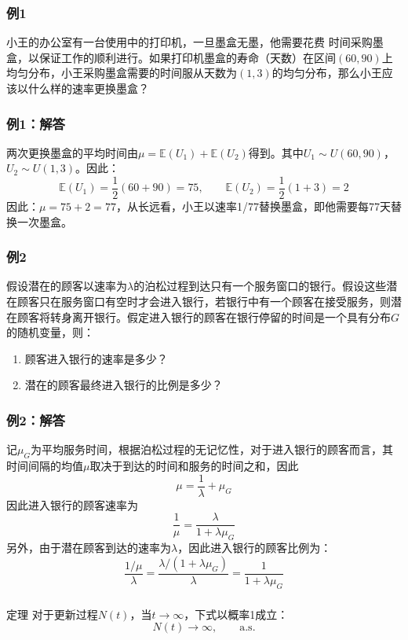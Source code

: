 \documentclass[t]{beamer}
\newcommand{\E}{\mathbb{E}}
\begin{document}
\begin{frame}
  \frametitle{例1}
  小王的办公室有一台使用中的打印机，一旦墨盒无墨，他需要花费
  时间采购墨盒，以保证工作的顺利进行。如果打印机墨盒的寿命（天数）在区间$(60,90)$上均匀分布，小王采购墨盒需要的时间服从天数为$(1,3)$的均匀分布，那么小王应该以什么样的速率更换墨盒？
  

\end{frame}


\begin{frame}
  \frametitle{例1：解答}
 两次更换墨盒的平均时间由$\mu=\E(U_1)+\E(U_2)$得到。其中$U_1\sim U(60,90)$，$U_2\sim U(1,3)$。因此：
  \[\E(U_1)=\frac{1}{2}(60+90)=75,\qquad \E(U_2)=\frac{1}{2}(1+3)=2\]
  因此：$\mu=75+2=77$，从长远看，小王以速率1/77替换墨盒，即他需要每77天替换一次墨盒。
  

\end{frame}


\begin{frame}
  \frametitle{例2}
  假设潜在的顾客以速率为$\lambda$的泊松过程到达只有一个服务窗口的银行。假设这些潜在顾客只在服务窗口有空时才会进入银行，若银行中有一个顾客在接受服务，则潜在顾客将转身离开银行。假定进入银行的顾客在银行停留的时间是一个具有分布$G$的随机变量，则：
  \begin{enumerate}
      \item 顾客进入银行的速率是多少？
      \item 潜在的顾客最终进入银行的比例是多少？
  \end{enumerate}
  

\end{frame}


\begin{frame}
  \frametitle{例2：解答}
  记$\mu_G$为平均服务时间，根据泊松过程的无记忆性，对于进入银行的顾客而言，其时间间隔的均值$\mu$取决于到达的时间和服务的时间之和，因此
  \[\mu=\frac{1}{\lambda}+\mu_G\]
  因此进入银行的顾客速率为
  \[\frac{1}{\mu}=\frac{\lambda}{1+\lambda\mu_G}\]
  另外，由于潜在顾客到达的速率为$\lambda$，因此进入银行的顾客比例为：
  \[\frac{1/\mu}{\lambda}=\frac{\lambda/(1+\lambda\mu_G)}{\lambda}=\frac{1}{1+\lambda\mu_G}\]
  

\end{frame}


\begin{frame}
  \frametitle{}
\begin{block}{定理}
  对于更新过程$N(t)$，当$t\to\infty$，下式以概率1成立：
\[
    N(t)\to\infty,\qquad \text{a.s.} \]
\end{block}


\end{frame}
\end{document}
